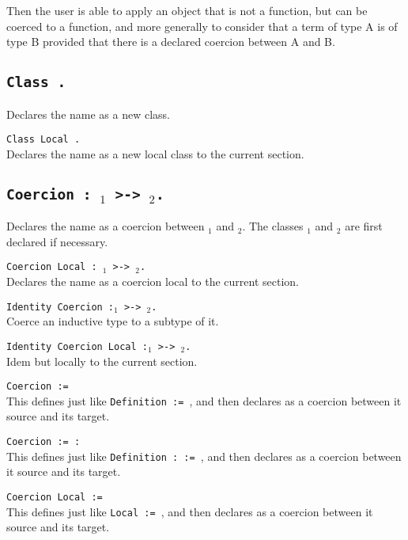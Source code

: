 Then the user is able to apply an
object that is not a function, but can be coerced to a function, and
more generally to consider that a term of type A is of type B provided
that there is a declared coercion between A and B.

\subsection{\tt Class {\ident}.}
Declares the name {\ident} as a new class.

\begin{Variant}
\item {\tt Class Local {\ident}.} \\
Declares the name {\ident} as a new local class to the current section.
\end{Variant}

\subsection{\tt Coercion {\ident} : {\ident$_1$} >-> {\ident$_2$}.}

Declares the name {\ident} as a coercion between {\ident$_1$} and
{\ident$_2$}. The classes {\ident$_1$} and {\ident$_2$} are first
declared if necessary.

\begin{Variants}
\item {\tt Coercion Local {\ident} : {\ident$_1$} >-> {\ident$_2$}.}\\
Declares the name {\ident} as a coercion local to the current section.

\item {\tt Identity Coercion {\ident}:{\ident$_1$} >->
    {\ident$_2$}.}\\
Coerce an inductive type to a subtype of it.

\item {\tt Identity Coercion Local {\ident}:{\ident$_1$} >-> {\ident$_2$}.} \\
Idem but locally to the current section.

\item {\tt Coercion {\ident} := {\term}}\\
  This defines {\ident} just like \texttt{Definition {\ident} :=
    {\term}}, and then declares {\ident} as a coercion between it
  source and its target.

\item {\tt Coercion {\ident} := {\term} : {\type}}\\
  This defines {\ident} just like 
  \texttt{Definition {\ident} : {\type} := {\term}}, and then
  declares {\ident} as a coercion between it source and its target. 

\item {\tt Coercion Local {\ident} := {\term}}\\
  This defines {\ident} just like \texttt{Local {\ident} :=
    {\term}}, and then declares {\ident} as a coercion between it
  source and its target.

\end{Variants}

